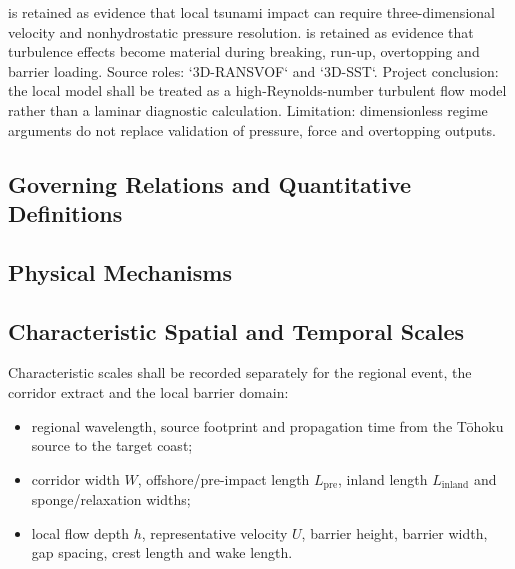 %

\textcite{qin2018comparison} is retained as evidence that local tsunami
impact can require three-dimensional velocity and nonhydrostatic
pressure resolution. \textcite{kozelkov2022turbulence} is retained as
evidence that turbulence effects become material during breaking,
run-up, overtopping and barrier loading. Source roles: `3D-RANSVOF`
and `3D-SST`. Project conclusion: the local model shall be treated as a
high-Reynolds-number turbulent flow model rather than a laminar
diagnostic calculation. Limitation: dimensionless regime arguments do
not replace validation of pressure, force and overtopping outputs.

\subsection{Governing Relations and Quantitative Definitions}
\label{sec:res-phy-scl-governing-relations}

%

\subsection{Physical Mechanisms}
\label{sec:res-phy-scl-physical-mechanisms}


\subsection{Characteristic Spatial and Temporal Scales}
\label{sec:res-phy-scl-characteristic-spatial-temporal-scales}

Characteristic scales shall be recorded separately for the regional
event, the corridor extract and the local barrier domain:

\begin{itemize}
  \item regional wavelength, source footprint and propagation time from
    the Tōhoku source to the target coast;
  \item corridor width $W$, offshore/pre-impact length
    $L_{\mathrm{pre}}$, inland length $L_{\mathrm{inland}}$ and
    sponge/relaxation widths;
  \item local flow depth $h$, representative velocity $U$, barrier
    height, barrier width, gap spacing, crest length and wake length.
\end{itemize}

